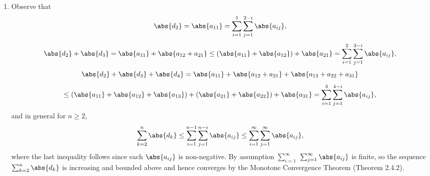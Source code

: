 \documentclass{lew98_solutions}
\begin{document}
\begin{solution}
    \begin{enumerate}
        \item Observe that
        \begin{gather*}
            \abs{d_2} = \abs{a_{11}} = \sum_{i=1}^1 \sum_{j=1}^{2-i} \abs{a_{ij}}, \\[1.25mm]
            \abs{d_2} + \abs{d_3} = \abs{a_{11}} + \abs{a_{12} + a_{21}} \leq (\abs{a_{11}} + \abs{a_{12}}) + \abs{a_{21}} = \sum_{i=1}^2 \sum_{j=1}^{3-i} \abs{a_{ij}},
        \end{gather*}
        \vspace{-4mm}
        \begin{multline*}
            \abs{d_2} + \abs{d_3} + \abs{d_4} = \abs{a_{11}} + \abs{a_{12} + a_{21}} + \abs{a_{13} + a_{22} + a_{31}} \\[1.25mm]
            \leq (\abs{a_{11}} + \abs{a_{12}} + \abs{a_{13}}) + (\abs{a_{21}} + \abs{a_{22}}) + \abs{a_{31}} = \sum_{i=1}^3 \sum_{j=1}^{4-i} \abs{a_{ij}},
        \end{multline*}
        and in general for \( n \geq 2 \),
        \[
            \sum_{k=2}^n \abs{d_k} \leq \sum_{i=1}^{n-1} \sum_{j=1}^{n-i} \abs{a_{ij}} \leq \sum_{i=1}^{\infty} \sum_{j=1}^{\infty} \abs{a_{ij}},
        \]
        where the last inequality follows since each \( \abs{a_{ij}} \) is non-negative. By assumption \( \sum_{i=1}^{\infty} \) \( \sum_{j=1}^{\infty} \abs{a_{ij}} \) is finite, so the sequence \( \sum_{k=2}^n \abs{d_k} \) is increasing and bounded above and hence converges by the Monotone Convergence Theorem (Theorem 2.4.2).


\end{enumerate}
\end{solution}
\end{document}
